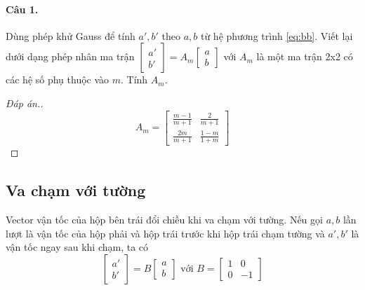 \documentclass[11pt]{article}
\begin{document}
\paragraph{Câu 1.}
\label{sec:orgdba3652}
Dùng phép khử Gauss để tính \(a', b'\) theo \(a, b\) từ hệ phương trình
\eqref{eq:bb}. Viết lại dưới dạng phép nhân ma trận \(\begin{bmatrix} a'
\\ b' \end{bmatrix} = A_m  \begin{bmatrix} a
\\ b \end{bmatrix}\) với \(A_m\) là một ma trận 2x2 có các hệ số phụ thuộc vào \(m\). Tính \(A_m\).
\begin{proof}[Đáp án.]
\[
A_m =  \begin{bmatrix} \frac{m-1}{m+1} & \frac{2}{m+1}\\ \frac{2m}{m+1} &
\frac{1-m}{1+m} \end{bmatrix}
\]
\end{proof}


\subsection*{Va chạm với tường}
\label{sec:orga9110e9}
Vector vận tốc của hộp bên trái đổi chiều khi va chạm với tường. Nếu gọi \(a,b\) lần lượt là
vận tốc của hộp phải và hộp trái trước khi hộp trái chạm tường
và \(a', b'\) là vận tốc ngay sau khi chạm, ta có 
\begin{equation*}
\begin{bmatrix} a' \\ b'  \end{bmatrix} 
= B  \begin{bmatrix} a \\ b \end{bmatrix}
\text{ với } B = \begin{bmatrix}1 & 0 \\ 0 & -1 \end{bmatrix}
\end{equation*}
\end{document}
